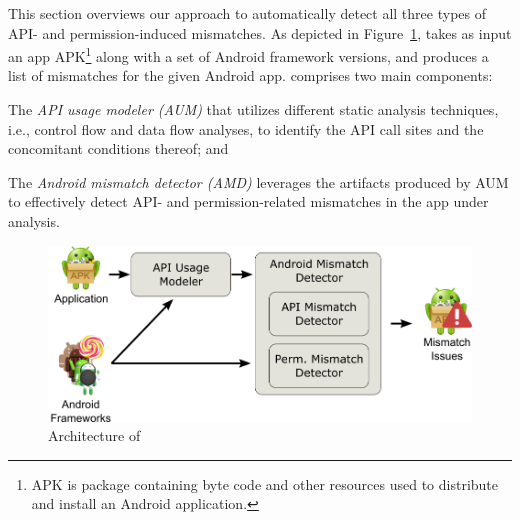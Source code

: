 
This section overviews our approach to automatically detect all three types of API- and permission-induced mismatches. 
As depicted in Figure~\ref{fig:arch}, \@approach takes as input an app APK\footnote{APK is package containing byte code and other resources used to distribute and install an Android application.} along with a set of Android framework versions, and produces a list of mismatches for the given Android app.  
\@approach comprises two main components:
\begin{enumerate*}[label=(\arabic*)]
    \item The \textit{API usage modeler (AUM)} that utilizes different static analysis techniques, i.e., control flow and data flow analyses, to  identify the API call sites and the concomitant conditions thereof; and
    \item The \textit{Android mismatch detector (AMD)} leverages the artifacts produced by AUM to effectively detect API- and permission-related mismatches in the app under analysis.
\end{enumerate*}
 

\begin{figure}[t!]
    \centering
    \includegraphics[width=0.8\linewidth]{images/Approach.png}
    \caption{Architecture of \@approach}
    \label{fig:arch}
\end{figure}

